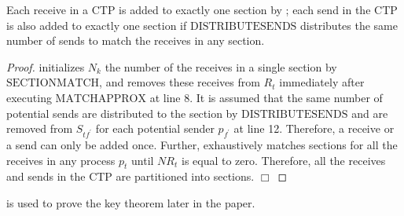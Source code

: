 \begin{lemma}
\label{lemma:section}
Each receive in a CTP is added to exactly one section by ; each send in the CTP is also added to exactly one section if $\mathrm{DISTRIBUTESENDS}$ distributes the same number of sends to match the receives in any section.
\end{lemma}
\begin{proof}
 initializes $N_k$ the number of the receives in a single section by $\mathrm{SECTIONMATCH}$, and removes these receives from $R_t$ immediately after executing $\mathrm{MATCHAPPROX}$ at line 8. It is assumed that the same number of potential sends are distributed to the section by $\mathrm{DISTRIBUTESENDS}$ and are removed from $S_{tf^\prime}$ for each potential sender $p_{f^\prime}$ at line 12. Therefore, a receive or a send can only be added once. 
Further,  exhaustively matches sections for all the receives in any process $p_t$ until $\mathit{NR}_{t}$ is equal to zero. 
Therefore, all the receives and sends in the CTP are partitioned into sections. 
$\Box$
\end{proof}
 is used to prove the key theorem later in the paper.


